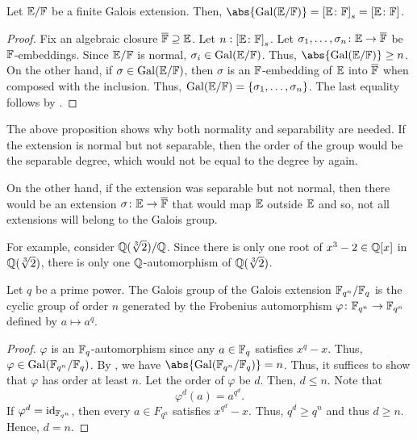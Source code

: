 \begin{prop} \label{prop:Galois-order-is-degree}
    Let $\mathbb{E}/\mathbb{F}$ be a finite Galois extension. Then, $\abs{\Gal(\E/\F)} = \left[ \E\colon\F \right]_s = \left[ \E\colon\F \right]$. 
\end{prop}

\begin{proof}
    Fix an algebraic closure $\overline{\mathbb{F}} \supseteq \mathbb{E}$. Let $n \vcentcolon \left[ \mathbb{E}\colon\mathbb{F} \right]_s$. Let $\sigma_1, \ldots, \sigma_n \colon \mathbb{E} \to \overline{\mathbb{F}}$ be $\mathbb{F}$-embeddings. Since $\mathbb{E}/\mathbb{F}$ is normal, $\sigma_i \in \operatorname{Gal}(\mathbb{E}/\mathbb{F})$. Thus, $\abs{\Gal(\E/\F)} \geq n$. On the other hand, if $\sigma \in \operatorname{Gal}(\mathbb{E}/\mathbb{F})$, then $\sigma$ is an $\mathbb{F}$-embedding of $\mathbb{E}$ into $\overline{\mathbb{F}}$ when composed with the inclusion. Thus, $\operatorname{Gal}(\mathbb{E}/\mathbb{F}) = \left\{ \sigma_1, \ldots, \sigma_n \right\}$. The last equality follows by .
\end{proof}

\begin{rem}
    The above proposition shows why both normality and separability are needed. If the extension is normal but not separable, then the order of the group would be the separable degree, which would not be equal to the degree by  again.
    
    On the other hand, if the extension was separable but not normal, then there would be an extension $\sigma \colon \mathbb{E} \to \overline{\mathbb{F}}$ that would map $\mathbb{E}$ outside $\mathbb{E}$ and so, not all extensions will belong to the Galois group. 
    
    For example, consider $\mathbb{Q}(\sqrt[3]{2})/\mathbb{Q}$. Since there is only one root of $x^3 - 2 \in \mathbb{Q}[x]$ in $\mathbb{Q}(\sqrt[3]{2})$, there is only one $\mathbb{Q}$-automorphism of $\mathbb{Q}(\sqrt[3]{2})$.
\end{rem}

\begin{prop}
    Let $q$ be a prime power. The Galois group of the Galois extension $\mathbb{F}_{q^n} / \mathbb{F}_q$ is the cyclic group of order $n$ generated by the Frobenius automorphism $\varphi \colon \mathbb{F}_{q^n} \to \mathbb{F}_{q^n}$ defined by $a \mapsto a^q$.
\end{prop}
\begin{proof}
    $\varphi$ is an $\mathbb{F}_q$-automorphism since any $a \in \mathbb{F}_q$ satisfies $x^q - x$. Thus, $\varphi \in \operatorname{Gal}(\mathbb{F}_{q^n}/\mathbb{F}_q)$. By , we have $\abs{\Gal(\F_{q^n}/\F_q)} = n$. Thus, it suffices to show that $\varphi$ has order at least $n$. Let the order of $\varphi$ be $d$. Then, $d \leq n$. Note that
    \[
        \varphi^d(a) = a^{q^d}.
    \]
    If $\varphi^d = \operatorname{id}_{\mathbb{F}_{q^n}}$, then every $a \in F_{q^n}$ satisfies $x^{q^d} - x$. Thus, $q^d \geq q^n$ and thus $d \geq n$. Hence, $d = n$. 
\end{proof}

